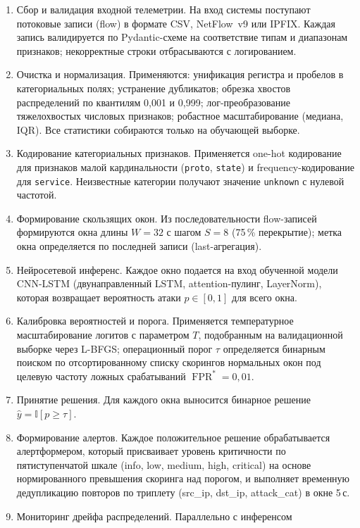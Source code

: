 \begin{enumerate}
    \item Сбор и валидация входной телеметрии. На вход системы
    поступают потоковые записи (flow) в формате CSV, NetFlow~v9
    или IPFIX. Каждая запись валидируется по Pydantic-схеме на
    соответствие типам и диапазонам признаков; некорректные строки
    отбрасываются с логированием.
    \item Очистка и нормализация. Применяются: унификация регистра
    и пробелов в категориальных полях; устранение дубликатов;
    обрезка хвостов распределений по квантилям 0,001 и 0,999;
    лог-преобразование тяжелохвостых числовых признаков; робастное
    масштабирование (медиана, IQR). Все статистики собираются
    только на обучающей выборке.
    \item Кодирование категориальных признаков. Применяется
    one-hot кодирование для признаков малой кардинальности
    (\texttt{proto}, \texttt{state}) и frequency-кодирование для
    \texttt{service}. Неизвестные категории получают значение
    \texttt{unknown} с нулевой частотой.
    \item Формирование скользящих окон. Из последовательности
    flow-записей формируются окна длины $W = 32$ с шагом $S = 8$
    (75\,\% перекрытие); метка окна определяется по последней
    записи (last-агрегация).
    \item Нейросетевой инференс. Каждое окно подается на вход
    обученной модели CNN-LSTM (двунаправленный LSTM,
    attention-пулинг, LayerNorm), которая возвращает вероятность
    атаки $p \in [0, 1]$ для всего окна.
    \item Калибровка вероятностей и порога. Применяется
    температурное масштабирование логитов с параметром $T$,
    подобранным на валидационной выборке через L-BFGS;
    операционный порог $\tau$ определяется бинарным поиском по
    отсортированному списку скорингов нормальных окон под целевую
    частоту ложных срабатываний $\operatorname{FPR}^* = 0{,}01$.
    \item Принятие решения. Для каждого окна выносится бинарное
    решение $\hat{y} = \mathbb{I}[p \geq \tau]$.
    \item Формирование алертов. Каждое положительное решение
    обрабатывается алертформером, который присваивает уровень
    критичности по пятиступенчатой шкале (info, low, medium, high,
    critical) на основе нормированного превышения скоринга над
    порогом, и выполняет временную дедупликацию повторов по
    триплету (src\_ip, dst\_ip, attack\_cat) в окне 5\,с.
    \item Мониторинг дрейфа распределений. Параллельно с инференсом

\end{enumerate}

